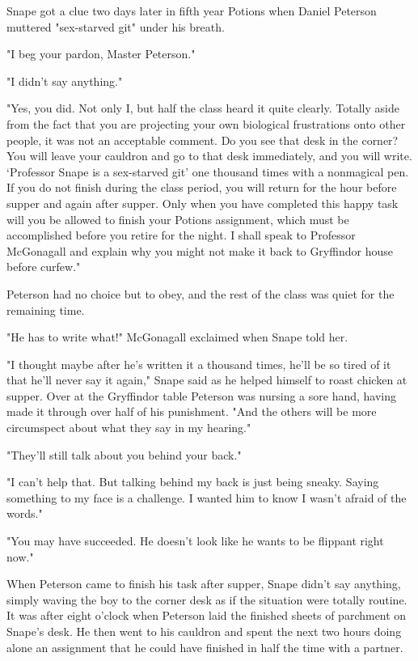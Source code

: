 \documentclass[a4paper,11pt]{article}
\begin{document}
Snape got a clue two days later in fifth year Potions when Daniel Peterson muttered "sex-starved git" under his breath.

"I beg your pardon, Master Peterson."

"I didn't say anything."

"Yes, you did. Not only I, but half the class heard it quite clearly. Totally aside from the fact that you are projecting your own biological frustrations onto other people, it was not an acceptable comment. Do you see that desk in the corner? You will leave your cauldron and go to that desk immediately, and you will write. `Professor Snape is a sex-starved git' one thousand times with a nonmagical pen. If you do not finish during the class period, you will return for the hour before supper and again after supper. Only when you have completed this happy task will you be allowed to finish your Potions assignment, which must be accomplished before you retire for the night. I shall speak to Professor McGonagall and explain why you might not make it back to Gryffindor house before curfew."

Peterson had no choice but to obey, and the rest of the class was quiet for the remaining time.

"He has to write what!" McGonagall exclaimed when Snape told her.

"I thought maybe after he's written it a thousand times, he'll be so tired of it that he'll never say it again," Snape said as he helped himself to roast chicken at supper. Over at the Gryffindor table Peterson was nursing a sore hand, having made it through over half of his punishment. "And the others will be more circumspect about what they say in my hearing."

"They'll still talk about you behind your back."

"I can't help that. But talking behind my back is just being sneaky. Saying something to my face is a challenge. I wanted him to know I wasn't afraid of the words."

"You may have succeeded. He doesn't look like he wants to be flippant right now."

When Peterson came to finish his task after supper, Snape didn't say anything, simply waving the boy to the corner desk as if the situation were totally routine. It was after eight o'clock when Peterson laid the finished sheets of parchment on Snape's desk. He then went to his cauldron and spent the next two hours doing alone an assignment that he could have finished in half the time with a partner.
\end{document}
